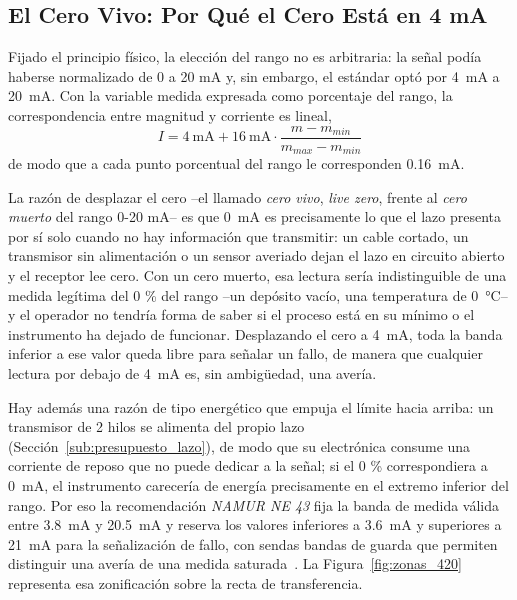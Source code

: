 
\subsection{El Cero Vivo: Por Qué el Cero Está en 4 mA}\label{sub:cero_vivo}

Fijado el principio físico, la elección del rango no es arbitraria: la señal podía haberse normalizado de 0 a 20 mA y, sin embargo, el estándar optó por \SI{4}{\milli\ampere} a \SI{20}{\milli\ampere}. Con la variable medida expresada como porcentaje del rango, la correspondencia entre magnitud y corriente es lineal,
\begin{equation}\label{eq:recta_420}
    I = \SI{4}{\milli\ampere} + \SI{16}{\milli\ampere}\cdot\frac{m - m_{min}}{m_{max} - m_{min}}
\end{equation}
de modo que a cada punto porcentual del rango le corresponden \SI{0.16}{\milli\ampere}.

La razón de desplazar el cero --el llamado \emph{cero vivo}, \textit{live zero}, frente al \emph{cero muerto} del rango 0-20 mA-- es que \SI{0}{\milli\ampere} es precisamente lo que el lazo presenta por sí solo cuando no hay información que transmitir: un cable cortado, un transmisor sin alimentación o un sensor averiado dejan el lazo en circuito abierto y el receptor lee cero. Con un cero muerto, esa lectura sería indistinguible de una medida legítima del 0 \% del rango --un depósito vacío, una temperatura de \SI{0}{\celsius}-- y el operador no tendría forma de saber si el proceso está en su mínimo o el instrumento ha dejado de funcionar. Desplazando el cero a \SI{4}{\milli\ampere}, toda la banda inferior a ese valor queda libre para señalar un fallo, de manera que cualquier lectura por debajo de \SI{4}{\milli\ampere} es, sin ambigüedad, una avería.

Hay además una razón de tipo energético que empuja el límite hacia arriba: un transmisor de 2 hilos se alimenta del propio lazo (Sección~\ref{sub:presupuesto_lazo}), de modo que su electrónica consume una corriente de reposo que no puede dedicar a la señal; si el 0 \% correspondiera a \SI{0}{\milli\ampere}, el instrumento carecería de energía precisamente en el extremo inferior del rango. Por eso la recomendación \emph{NAMUR NE 43} fija la banda de medida válida entre \SI{3.8}{\milli\ampere} y \SI{20.5}{\milli\ampere} y reserva los valores inferiores a \SI{3.6}{\milli\ampere} y superiores a \SI{21}{\milli\ampere} para la señalización de fallo, con sendas bandas de guarda que permiten distinguir una avería de una medida saturada~\cite{namur_ne43_1994}. La Figura~\ref{fig:zonas_420} representa esa zonificación sobre la recta de transferencia.

